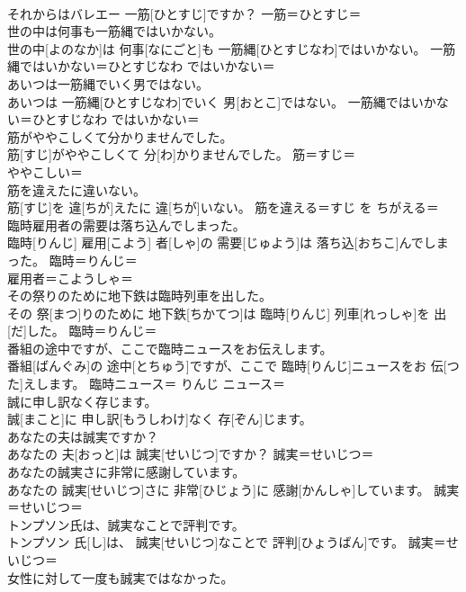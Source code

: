 \documentclass[8pt]{extreport}
\begin{document}
\begin{CJK}{UTF8}{min}
\\	それからはバレエー 一筋[ひとすじ]ですか？	一筋＝ひとすじ＝ 
\\	世の中は何事も一筋縄ではいかない。	
\\	世の中[よのなか]は 何事[なにごと]も 一筋縄[ひとすじなわ]ではいかない。	一筋縄ではいかない＝ひとすじなわ ではいかない＝ 
\\	あいつは一筋縄でいく男ではない。	
\\	あいつは 一筋縄[ひとすじなわ]でいく 男[おとこ]ではない。	一筋縄ではいかない＝ひとすじなわ ではいかない＝ 
\\	筋がややこしくて分かりませんでした。	
\\	筋[すじ]がややこしくて 分[わ]かりませんでした。	筋＝すじ＝ 
\\	ややこしい＝ 
\\	筋を違えたに違いない。	
\\	筋[すじ]を 違[ちが]えたに 違[ちが]いない。	筋を違える＝すじ を ちがえる＝ 
\\	臨時雇用者の需要は落ち込んでしまった。	
\\	臨時[りんじ] 雇用[こよう] 者[しゃ]の 需要[じゅよう]は 落ち込[おちこ]んでしまった。	臨時＝りんじ＝ 
\\	雇用者＝こようしゃ＝ 
\\	その祭りのために地下鉄は臨時列車を出した。	
\\	その 祭[まつ]りのために 地下鉄[ちかてつ]は 臨時[りんじ] 列車[れっしゃ]を 出[だ]した。	臨時＝りんじ＝ 
\\	番組の途中ですが、ここで臨時ニュースをお伝えします。	
\\	番組[ばんぐみ]の 途中[とちゅう]ですが、ここで 臨時[りんじ]ニュースをお 伝[つた]えします。	臨時ニュース＝ りんじ ニュース＝ 
\\	誠に申し訳なく存じます。	
\\	誠[まこと]に 申し訳[もうしわけ]なく 存[ぞん]じます。	
\\	あなたの夫は誠実ですか？	
\\	あなたの 夫[おっと]は 誠実[せいじつ]ですか？	誠実＝せいじつ＝ 
\\	あなたの誠実さに非常に感謝しています。	
\\	あなたの 誠実[せいじつ]さに 非常[ひじょう]に 感謝[かんしゃ]しています。	誠実＝せいじつ＝ 
\\	トンプソン氏は、誠実なことで評判です。	
\\	トンプソン 氏[し]は、 誠実[せいじつ]なことで 評判[ひょうばん]です。	誠実＝せいじつ＝ 
\\	女性に対して一度も誠実ではなかった。	

\end{CJK}
\end{document}
